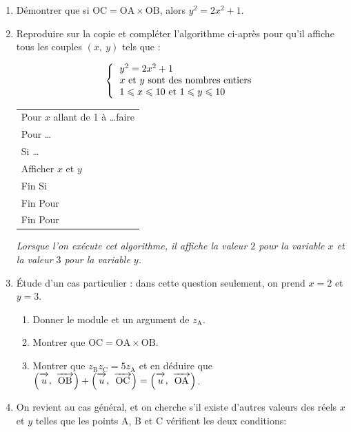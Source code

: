 \documentclass[10pt,a4paper]{article}
\newcommand{\vect}[1]{\overrightarrow{\,\mathstrut#1\,}}
\begin{document}
\begin{enumerate}
\item Démontrer que si $\text{OC} = \text{OA} \times \text{OB}$, alors $y^2 = 2x^2 + 1$.
\item Reproduire sur la copie et compléter l'algorithme ci-après pour qu'il affiche tous les couples $(x,~y)$ tels que :

\[\left\{\begin{tabular}{l}
$y^2 = 2x^2 + 1$\\
$x$ et $y$ sont des nombres entiers\\
$1  \leqslant x \leqslant 10$ et $1 \leqslant y \leqslant 10$\\
\end{tabular}\right.\]

\begin{center}
\begin{tabularx}{0.5\linewidth}{|X|}\hline
Pour $x$ allant de 1 à \ldots faire\\
\hspace{0.5cm}Pour \ldots\\
\hspace{1cm}Si \ldots\\
\hspace{1.5cm}Afficher $x$ et $y$\\
\hspace{1cm}Fin Si\\
\hspace{0.5cm}Fin Pour\\
Fin Pour\\ \hline
\end{tabularx}
\end{center}

\emph{Lorsque l'on exécute cet algorithme, il affiche la valeur $2$ pour la variable $x$ et la valeur $3$ pour la variable $y$.}

\smallskip

\item Étude d'un cas particulier : dans cette question seulement, on prend $x = 2$ et $y = 3$.
	\begin{enumerate}
		\item Donner le module et un argument de $z_{\text{A}}$.
		\item Montrer que $\text{OC} = \text{OA} \times \text{OB}$.
		\item Montrer que $z_{\text{B}}z_{\text{C}} = 5 z_{\text{A}}$ et en déduire que 
		$\left(\vect{u},~\vect{\text{OB}}\right) + \left(\vect{u},~\vect{\text{OC}}\right) = \left(\vect{u},~\vect{\text{OA}}\right)$.
	\end{enumerate}
\item On revient au cas général, et on cherche s'il existe d'autres valeurs des réels $x$ et $y$ telles que les points A, B et C vérifient les deux conditions:
	

\end{enumerate}
\end{document}
